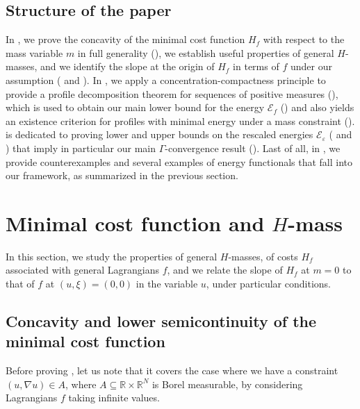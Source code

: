 \documentclass[10pt]{amsart}
\theoremstyle{plain}
\theoremstyle{definition}
\newcommand{\R}{\mathbb{R}}
\newcommand{\ener}{\mathcal{E}}
\newcommand{\eps}{\varepsilon}
\begin{document}
\subsection{Structure of the paper} In , we prove the concavity of the minimal cost function \(H_f\) with respect to the mass variable \(m\) in full generality (), we establish useful properties of general \(H\)-masses, and we identify the slope at the origin of \(H_f\) in terms of \(f\) under our assumption ( and ). In , we apply a concentration-compactness principle to provide a profile decomposition theorem for sequences of positive measures (), which is used to obtain our main lower bound for the energy \(\ener_f\) () and also yields an existence criterion for profiles with minimal energy under a mass constraint ().  is dedicated to proving lower and upper bounds on the rescaled energies \(\ener_\eps\) ( and ) that imply in particular our main \(\Gamma\)-convergence result (). Last of all, in , we provide counterexamples and several examples of energy functionals that fall into our framework, as summarized in the previous section.

\section{Minimal cost function and \texorpdfstring{\(H\)-mass}{H-mass}}\label{sectionMinimalCost}

In this section, we study the properties of general $H$-masses, of costs $H_f$ associated with general Lagrangians $f$, and we relate the slope of $H_f$ at $m=0$ to that of $f$ at $(u,\xi) = (0,0)$ in the variable $u$, under particular conditions.

\subsection{Concavity and lower semicontinuity of the minimal cost function}

Before proving , let us note that it covers the case where we have a constraint \((u,\nabla u)\in A\), where \(A\subseteq\R\times \R^N\) is Borel measurable, by considering Lagrangians \(f\) taking infinite values.
\end{document}
